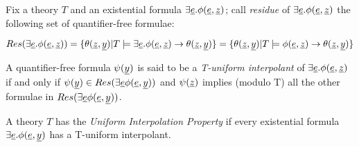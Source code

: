 \begin{definition}
  Fix a theory $T$ and an existential formula $\exists \underline{e} . \phi(\underline{e}, \underline{z})$; call \emph{residue} of $\exists \underline{e} . \phi(\underline{e}, \underline{z})$ the following set of
  quantifier-free formulae:

  \begin{equation*}
    Res(\exists \underline{e} . \phi(\underline{e}, \underline{z})) = \{ \theta(\underline{z}, \underline{y}) | T \models \exists \underline{e} . \phi(\underline{e}, \underline{z}) \rightarrow \theta(\underline{z}, \underline{y}) \} =\{ \theta(\underline{z}, \underline{y}) | T \models \phi(\underline{e}, \underline{z}) \rightarrow \theta(\underline{z}, \underline{y}) \}
  \end{equation*}

  A quantifier-free formula $\psi(\underline{y})$ is said to be a \emph{T-uniform interpolant} 
  of $\exists \underline{e} . \phi(\underline{e}, \underline{z})$ if and only if $\psi(\underline{y}) \in Res(\exists \underline{e} \phi(\underline{e}, \underline{y}))$ and 
  $\psi(\underline{z})$ implies (modulo T)
  all the other formulae in $Res(\exists \underline{e} \phi(\underline{e}, \underline{y}))$.

  A theory $T$ has the \emph{Uniform Interpolation Property} 
  if every existential formula
  $\exists \underline{e} . \phi(\underline{e},\underline{y})$ has a T-uniform interpolant. 

\end{definition}

